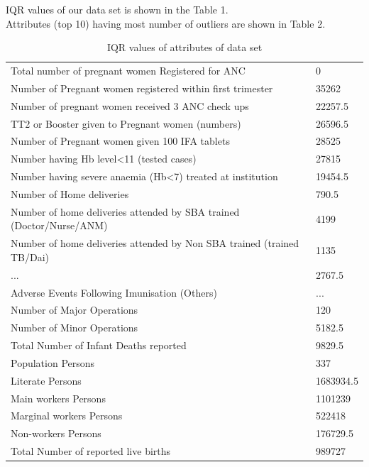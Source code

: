 \documentclass[12pt]{article}
\begin{document}
IQR values of our data set is shown in the Table 1.\\
Attributes (top 10) having most number of outliers are shown in Table 2.
\pagebreak
\begin{table}[h]
\caption{IQR values of attributes of data set}
\begin{tabular}{|l|l|}
\hline
Total number of pregnant women Registered for ANC                      & 0         \\
Number of Pregnant women registered within first trimester             & 35262     \\
Number of pregnant women received 3 ANC check ups                      & 22257.5   \\
TT2 or Booster given to Pregnant women (numbers)                       & 26596.5   \\
Number of Pregnant women given 100 IFA tablets                         & 28525     \\
Number having Hb level\textless{}11 (tested cases)                     & 27815     \\
Number having severe anaemia (Hb\textless{}7) treated at institution   & 19454.5   \\
Number of Home deliveries                                              & 790.5     \\
Number of home deliveries attended by SBA trained (Doctor/Nurse/ANM)   & 4199      \\
Number of home deliveries attended by Non SBA trained (trained TB/Dai) & 1135      \\
...                                                                    & 2767.5    \\
Adverse Events Following Imunisation (Others)                          & ...       \\
Number of Major Operations                                             & 120       \\
Number of Minor Operations                                             & 5182.5    \\
Total Number of Infant Deaths reported                                 & 9829.5    \\
Population Persons                                                     & 337       \\
Literate Persons                                                       & 1683934.5 \\
Main workers Persons                                                   & 1101239   \\
Marginal workers Persons                                               & 522418    \\
Non-workers Persons                                                    & 176729.5  \\
Total Number of reported live births                                   & 989727   \\ \hline
\end{tabular}
\end{table}
\end{document}

